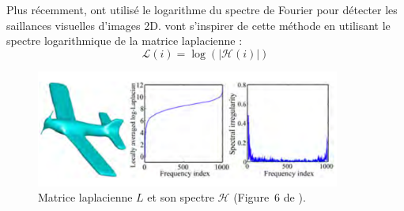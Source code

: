 %
Plus récemment,  ont utilisé le logarithme du spectre de
Fourier pour détecter les saillances visuelles d'images 2D.  vont
s'inspirer de cette méthode en utilisant le spectre logarithmique de la matrice
laplacienne :
%
\begin{equation}
  \mathcal{L}(i) = \log(|\mathcal{H}(i)|)
\end{equation}
%
%
\begin{figure}[ht]{
    \begin{center}
    \includegraphics[width=10cm]{images/Feature/LaplacianSpectrumLogAvg}
    \end{center}}
    \caption[Matrice laplacienne et son spectre.]{Matrice laplacienne $L$ et son spectre $\mathcal{H}$ (Figure~6 de \cite{Song2014}).
      \label{fig:laplacian-spectrum-avg}}
\end{figure}
%
